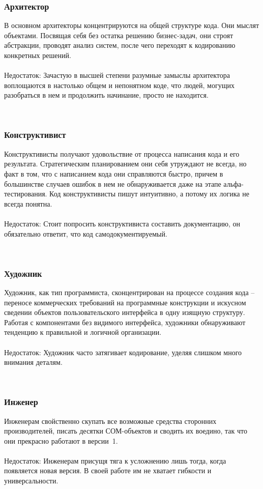 \documentclass{../industrial-development}
\begin{document}
\begin{frame} \frametitle{Архитектор}
	В основном архитекторы концентрируются на общей структуре кода. Они мыслят объектами. Посвящая себя без остатка решению бизнес-задач, они строят абстракции, проводят анализ систем, после чего переходят к кодированию конкретных решений.\\ 
~\\
\alert{Недостаток:}
Зачастую в высшей степени разумные замыслы архитектора воплощаются в настолько общем и непонятном коде, что людей, могущих разобраться в нем и продолжить начинание, просто не находится.
\end{frame}
\lecturenotes
~\cite{How_to_be_a_good_IT-manager}

\begin{frame} \frametitle{Конструктивист}
	Конструктивисты получают удовольствие от процесса написания кода и его результата. Стратегическим планированием они себя утруждают не всегда, но факт в том, что с написанием кода они справляются быстро, причем в большинстве случаев ошибок в нем не обнаруживается даже на этапе альфа-тестирования. Код конструктивисты пишут интуитивно, а потому их логика не всегда понятна.\\ 
~\\
\alert{Недостаток:}
Стоит попросить конструктивиста составить документацию, он обязательно ответит, что код самодокументируемый. 
\end{frame}
\lecturenotes
~\cite{How_to_be_a_good_IT-manager}

\begin{frame} \frametitle{Художник}
	Художник, как тип программиста, сконцентрирован на процессе создания кода – переносе коммерческих требований на программные конструкции и искусном сведении объектов пользовательского интерфейса в одну изящную структуру. Работая с компонентами без видимого интерфейса, художники обнаруживают тенденцию к правильной и логичной организации. \\ 
~\\
\alert{Недостаток:}
Художник часто затягивает кодирование, уделяя слишком много внимания деталям.
\end{frame}
\lecturenotes
~\cite{How_to_be_a_good_IT-manager}

\begin{frame} \frametitle{Инженер}
	Инженерам свойственно скупать все возможные средства сторонних производителей, писать десятки СОМ-объектов и сводить их воедино, так что они прекрасно работают в версии~1. \\ 
~\\
\alert{Недостаток:}
Инженерам присущя тяга к усложнению лишь тогда, когда появляется новая версия. В своей работе им не хватает гибкости и универсальности.
\end{frame}
\lecturenotes
~\cite{How_to_be_a_good_IT-manager}
\end{document}

